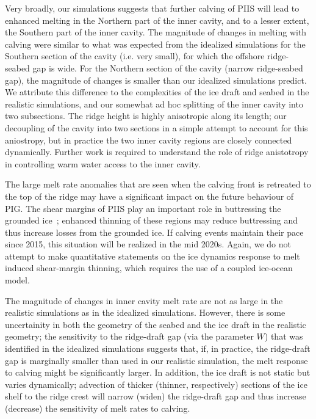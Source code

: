 \documentclass[draft]{agujournal2019}
\begin{document}
Very broadly, our simulations suggests that further calving of PIIS will lead to enhanced melting in the Northern part of the inner cavity, and to a lesser extent, the Southern part of the inner cavity. The magnitude of changes in melting with calving were similar to what was expected from the idealized simulations for the Southern section of the cavity (i.e. very small), for which the offshore ridge-seabed gap is wide. For the Northern section of the cavity (narrow ridge-seabed gap), the magnitude of changes is smaller than our idealized simulations predict. We attribute this difference to the complexities of the ice draft and seabed in the realistic simulations, and our somewhat ad hoc splitting of the inner cavity into two subsections. The ridge height is highly anisotropic along its length; our decoupling of the cavity into two sections in a simple attempt to account for this aniostropy, but in practice the two inner cavity regions are closely connected dynamically. Further work is required to understand the role of ridge anistotropy in controlling warm water access to the inner cavity.

The large melt rate anomalies that are seen when the calving front is retreated to the top of the ridge may have a significant impact on the future behaviour of PIG. The shear margins of PIIS play an important role in buttressing the grounded ice~\cite{Lhermitte2020PNAS}; enhanced thinning of these regions may reduce buttressing and thus increase losses from the grounded ice. If calving events maintain their pace since 2015, this situation will be realized in the mid 2020s. Again, we do not attempt to make quantitative statements on the ice dynamics response to melt induced shear-margin thinning, which requires the use of a coupled ice-ocean model.

The magnitude of changes in inner cavity melt rate are not as large in the realistic simulations as in the idealized simulations. However, there is some uncertainity in both the geometry of the seabed and the ice draft in the realistic geometry; the sensitivity to the ridge-draft gap (via the parameter $W$) that was identified in the idealized simulations suggests that, if, in practice, the ridge-draft gap is marginally smaller than used in our realistic simulation, the melt response to calving might be significantly larger. In addition, the ice draft is not static but varies dynamically; advection of thicker (thinner, respectively) sections of the ice shelf to the ridge crest will narrow (widen) the ridge-draft gap and thus increase (decrease) the sensitivity of melt rates to calving.
\end{document}
